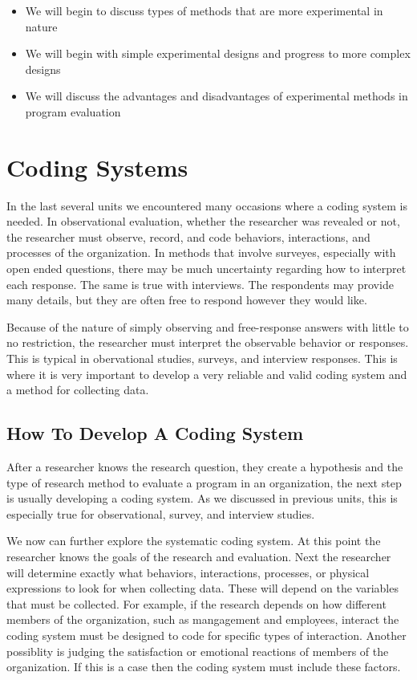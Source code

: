 \documentclass[]{book}
\theoremstyle{definition}
\theoremstyle{definition}
\theoremstyle{definition}
\theoremstyle{remark}
\begin{document}
\begin{itemize}
\item
  We will begin to discuss types of methods that are more experimental
  in nature
\item
  We will begin with simple experimental designs and progress to more
  complex designs
\item
  We will discuss the advantages and disadvantages of experimental
  methods in program evaluation
\end{itemize}

\hypertarget{coding-systems}{%
\chapter{Coding Systems}\label{coding-systems}}

In the last several units we encountered many occasions where a coding
system is needed. In observational evaluation, whether the researcher
was revealed or not, the researcher must observe, record, and code
behaviors, interactions, and processes of the organization. In methods
that involve surveyes, especially with open ended questions, there may
be much uncertainty regarding how to interpret each response. The same
is true with interviews. The respondents may provide many details, but
they are often free to respond however they would like.

Because of the nature of simply observing and free-response answers with
little to no restriction, the researcher must interpret the observable
behavior or responses. This is typical in obervational studies, surveys,
and interview responses. This is where it is very important to develop a
very reliable and valid coding system and a method for collecting data.

\hypertarget{how-to-develop-a-coding-system}{%
\section{How To Develop A Coding
System}\label{how-to-develop-a-coding-system}}

After a researcher knows the research question, they create a hypothesis
and the type of research method to evaluate a program in an
organization, the next step is usually developing a coding system. As we
discussed in previous units, this is especially true for observational,
survey, and interview studies.

We now can further explore the systematic coding system. At this point
the researcher knows the goals of the research and evaluation. Next the
researcher will determine exactly what behaviors, interactions,
processes, or physical expressions to look for when collecting data.
These will depend on the variables that must be collected. For example,
if the research depends on how different members of the organization,
such as mangagement and employees, interact the coding system must be
designed to code for specific types of interaction. Another possiblity
is judging the satisfaction or emotional reactions of members of the
organization. If this is a case then the coding system must include
these factors.
\end{document}
